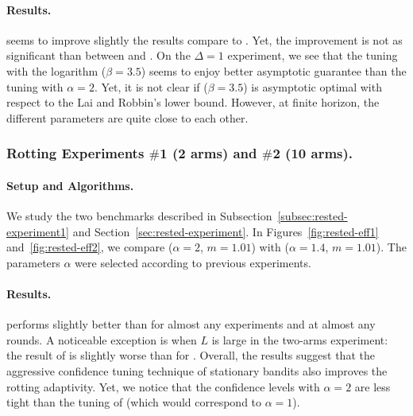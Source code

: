\paragraph{Results.}  \RAWUCBpp seems to improve slightly the results compare to \RAWUCB. Yet, the improvement is not as significant than between \MOSSa and \UCB. On the $\Delta=1$ experiment, we see that the tuning with the logarithm ($\beta=3.5$) seems to enjoy better asymptotic guarantee than the tuning with $\alpha = 2$. Yet, it is not clear if \RAWUCBpp ($\beta=3.5$) is asymptotic optimal with respect to the Lai and Robbin's lower bound. However, at finite horizon, the different parameters are quite close to each other.



\subsubsection{Rotting Experiments $\#$1 (2 arms) and $\#$2 (10 arms).}
\paragraph{Setup and Algorithms.} We study the two benchmarks described in Subsection~\ref{subsec:rested-experiment1} and Section~\ref{sec:rested-experiment}. In Figures~\ref{fig:rested-eff1} and~\ref{fig:rested-eff2}, we compare \EFFRAWpp ($\alpha=2$, $m=1.01$) with \EFFRAW  ($\alpha=1.4$, $m=1.01$). The parameters $\alpha$ were selected according to previous experiments.

\paragraph{Results.} \EFFRAWpp performs slightly better than \EFFRAW for almost any experiments and at almost any rounds. A noticeable exception is when $L$ is large in the two-arms experiment: the result of \EFFRAWpp is slightly worse than for \EFFRAW. Overall, the results suggest that the aggressive confidence tuning technique of stationary bandits also improves the rotting adaptivity. Yet, we notice that the confidence levels with $\alpha =2$ are less tight than the tuning of \MOSSa (which would correspond to $\alpha=1$).

